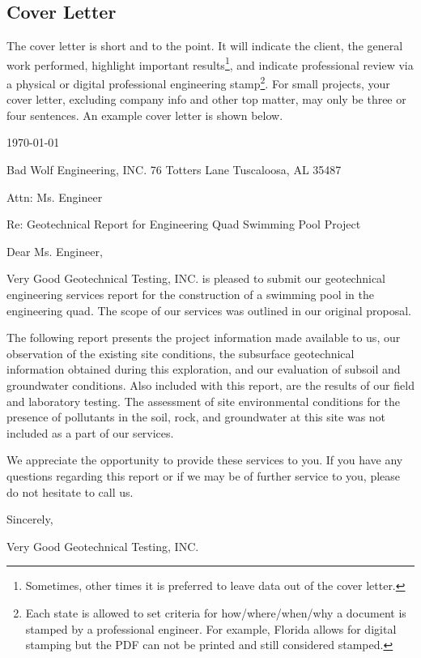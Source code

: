 \documentclass[12pt]{article}
\begin{document}
\pagebreak
\subsection{Cover Letter}
The cover letter is short and to the point. It will indicate the client, the general work performed, highlight important results\footnote{Sometimes, other times it is preferred to leave data out of the cover letter.}, and indicate professional review via a physical or digital professional engineering stamp\footnote{Each state is allowed to set criteria for how/where/when/why a document is stamped by a professional engineer. For example, Florida allows for digital stamping but the PDF can not be printed and still considered stamped.}. For small projects, your cover letter, excluding company info and other top matter, may only be three or four sentences. An example cover letter is shown below.

\begin{letter}
\today

Bad Wolf Engineering, INC.
76 Totters Lane
Tuscaloosa, AL 35487

Attn: Ms. Engineer

Re: Geotechnical Report for Engineering Quad Swimming Pool Project

Dear Ms. Engineer,

Very Good Geotechnical Testing, INC. is pleased to submit our geotechnical engineering services report for the construction of a swimming pool in the engineering quad. The scope of our services was outlined in our original proposal.

The following report presents the project information made available to us, our observation of the existing site conditions, the subsurface geotechnical information obtained during this exploration, and our evaluation of subsoil and groundwater conditions. Also included with this report, are the results of our field and laboratory testing. The assessment of site environmental conditions for the presence of pollutants in the soil, rock, and groundwater at this site was not included as a part of our services.

We appreciate the opportunity to provide these services to you. If you have any questions regarding this report or if we may be of further service to you, please do not hesitate to call us.

Sincerely,

Very Good Geotechnical Testing, INC.
\end{letter}
\end{document}
